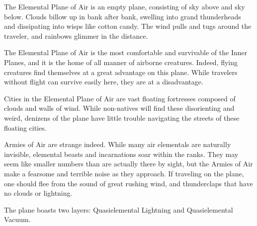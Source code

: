 The Elemental Plane of Air is an empty plane, consisting of sky above and sky below. Clouds billow up in bank after bank, swelling into grand thunderheads and dissipating into wisps like cotton candy. The wind pulls and tugs around the traveler, and rainbows glimmer in the distance.

The Elemental Plane of Air is the most comfortable and survivable of the Inner Planes, and it is the home of all manner of airborne creatures. Indeed, flying creatures find themselves at a great advantage on this plane. While travelers without flight can survive easily here, they are at a disadvantage.

Cities in the Elemental Plane of Air are vast floating fortresses composed of clouds and walls of wind. While non-natives will find these disorienting and weird, denizens of the plane have little trouble navigating the streets of these floating cities.

Armies of Air are strange indeed. While many air elementals are naturally invisible, elemental beasts and incarnations soar within the ranks. They may seem like smaller numbers than are actually there by sight, but the Armies of Air make a fearsome and terrible noise as they approach. If traveling on the plane, one should flee from the sound of great rushing wind, and thunderclaps that have no clouds or lightning.

The plane boasts two layers: Quasielemental Lightning and Quasielemental Vacuum.

\begin{figure}[h!]
\centering
{}
\end{figure}

